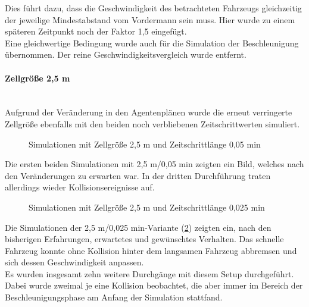 Dies führt dazu, dass die Geschwindigkeit des betrachteten Fahrzeugs gleichzeitig der jeweilige Mindestabstand vom Vordermann sein muss. 
Hier wurde zu einem späteren Zeitpunkt noch der Faktor 1,5 eingefügt.
\\
Eine gleichwertige Bedingung wurde auch für die Simulation der Beschleunigung übernommen.
Der reine Geschwindigkeitsvergleich wurde entfernt.


\paragraph*{Zellgröße 2,5 m}
\hfill \\
Aufgrund der Veränderung in den Agentenplänen wurde die erneut verringerte Zellgröße ebenfalls mit den beiden noch verbliebenen Zeitschrittwerten simuliert.

\begin{figure}[hptb]
  \centering 
   \qquad 
   \qquad 
  \caption{Simulationen mit Zellgröße 2,5 m und Zeitschrittlänge 0,05 min} 
  \label{figure:run24-26}
\end{figure}

Die ersten beiden Simulationen mit 2,5 m/0,05 min zeigten ein Bild, welches nach den Veränderungen zu erwarten war.
In der dritten Durchführung traten allerdings wieder Kollisionsereignisse auf.

\begin{figure}[hptb]
  \centering 
   \qquad 
   \qquad 
  \caption{Simulationen mit Zellgröße 2,5 m und Zeitschrittlänge 0,025 min} 
  \label{figure:run27-29}
\end{figure}

Die Simulationen der 2,5 m/0,025 min-Variante (\cref{figure:run27-29}) zeigten ein, nach den bisherigen Erfahrungen, erwartetes und gewünschtes Verhalten.
Das schnelle Fahrzeug konnte ohne Kollision hinter dem langsamen Fahrzeug abbremsen und sich dessen Geschwindigkeit anpassen.
\\
Es wurden insgesamt zehn weitere Durchgänge mit diesem Setup durchgeführt. 
Dabei wurde zweimal je eine Kollision beobachtet, die aber immer im Bereich der Beschleunigungsphase am Anfang der Simulation stattfand. 



